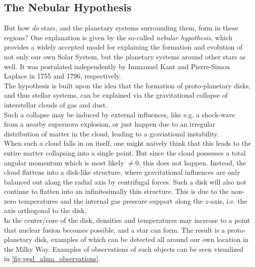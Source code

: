     

\clearpage\subsection{The Nebular Hypothesis}

    But how \textit{do} stars, and the planetary systems surrounding them, form in these regions?
    One explanation is given by 
    the so-called \textit{nebular hypothesis}, which provides a widely accepted model for 
    explaining the formation and evolution of not only our own Solar System, but the planetary 
    systems around other stars as well. 
    It was postulated independently by Immanuel Kant        %
    and Pierre-Simon Laplace                                %
    in 1755 and 1796, respectively. \\                      %

    The hypothesis is built upon the idea that the formation of proto-planetary disks, and thus 
    stellar systems, can be explained via the gravitational collapse of interstellar clouds 
    of gas and dust. \\

    Such a collapse may be induced by external influences, like e.g. a shock-wave from a nearby 
    supernova explosion, or just happen due to an irregular distribution of matter in the cloud, 
    leading to a graviational instability. \\

    When such a cloud falls in on itself, one might naively think that this leads to the 
    entire matter collapsing into a single point. But since the cloud possesses a total angular 
    momentum which is most likely $\neq 0$, this does not happen. 
    Instead, the cloud flattens into a disk-like structure, where gravitational influences
    are only balanced out along the radial axis by centrifugal forces. 
    Such a disk will also not continue to flatten into an infinitesimally thin structure.
    This is due to the non-zero temperatures and the internal gas pressure support along the 
    $z$-axis, i.e. the axis orthogonal to the disk. \\

    In the center/core of the disk, densities and temperatures may increase to a point that 
    nuclear fusion becomes possible, and a star can form. 
    The result is a proto-planetary disk, examples of which can be detected all around our own 
    location in the Milky Way. Examples of observations of such objects can be seen visualized 
    in \cref{fig:ppd_alma_observations}.

